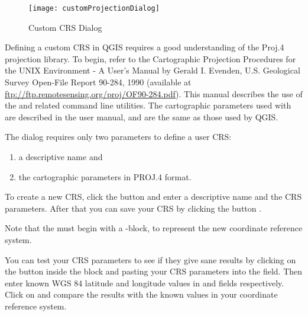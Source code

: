 \begin{figure}[ht]
   \centering
   \texttt{[image: customProjectionDialog]}
   \caption{Custom CRS Dialog \nixcaption}\label{fig:customprojections}
\end{figure}

Defining a custom CRS in QGIS requires a good understanding of the Proj.4
projection library. To begin, refer to the Cartographic Projection Procedures
for the UNIX Environment - A User's Manual by Gerald I. Evenden, U.S.
Geological Survey Open-File Report 90-284, 1990 (available at \url{ftp://ftp.remotesensing.org/proj/OF90-284.pdf}).
This manual describes the use of the  and related command line
utilities. The cartographic parameters used with  are
described in the user manual, and are the same as those used by QGIS.

The  dialog requires
only two parameters to define a user CRS:
\begin{enumerate}
\item a descriptive name and
\item the cartographic parameters in PROJ.4 format.
\end{enumerate}
To create a new CRS, click the  button and enter a
descriptive name and the CRS parameters. After that you can save your CRS by
clicking the button .

Note that the  must begin with a -block,
to represent the new coordinate reference system.

You can test your CRS parameters to see if they give sane results by
clicking on the  button inside the  block
and pasting your CRS parameters into
the  field. Then enter known WGS 84 latitude and longitude
values in  and  fields respectively.
Click on  and compare the results with the known values in
your coordinate reference system.

\FloatBarrier
